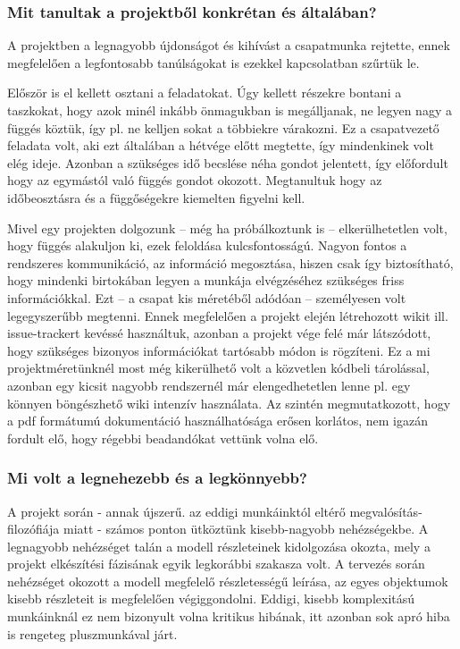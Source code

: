 		\subsubsection*{Mit tanultak a projektből konkrétan és általában?}
		A projektben a legnagyobb újdonságot és kihívást a csapatmunka rejtette, ennek megfelelően a legfontosabb tanúlságokat is ezekkel kapcsolatban szűrtük le.
		
		Először is el kellett osztani a feladatokat. Úgy kellett részekre bontani a taszkokat, hogy azok minél inkább önmagukban is megálljanak, ne legyen nagy a függés köztük, így pl. ne kelljen sokat a többiekre várakozni. Ez a csapatvezető feladata volt, aki ezt általában a hétvége előtt megtette, így mindenkinek volt elég ideje. Azonban a szükséges idő becslése néha gondot jelentett, így előfordult hogy az egymástól való függés gondot okozott. Megtanultuk hogy az időbeosztásra és a függőségekre kiemelten figyelni kell.
		
		Mivel egy projekten dolgozunk -- még ha próbálkoztunk is -- elkerülhetetlen volt, hogy függés alakuljon ki, ezek feloldása kulcsfontosságú. Nagyon fontos a rendszeres kommunikáció, az információ megosztása, hiszen csak így biztosítható, hogy mindenki birtokában legyen a munkája elvégzéséhez szükséges friss információkkal. Ezt -- a csapat kis méretéből adódóan -- személyesen volt legegyszerűbb megtenni. Ennek megfelelően a projekt elején létrehozott wikit ill. issue-trackert kevéssé használtuk, azonban a projekt vége felé már látszódott, hogy szükséges bizonyos információkat tartósabb módon is rögzíteni. Ez a mi projektméretünknél most még kikerülhető volt a közvetlen kódbeli tárolással, azonban egy kicsit nagyobb rendszernél már elengedhetetlen lenne pl. egy könnyen böngészhető wiki intenzív használata. Az szintén megmutatkozott, hogy a pdf formátumú dokumentáció használhatósága erősen korlátos, nem igazán fordult elő, hogy régebbi beadandókat vettünk volna elő.
		
		\subsubsection*{Mi volt a legnehezebb és a legkönnyebb?}
A projekt során - annak újszerű. az eddigi munkáinktól eltérő megvalósítás-filozófiája miatt - számos ponton ütköztünk kisebb-nagyobb nehézségekbe. A legnagyobb nehézséget talán a modell részleteinek kidolgozása okozta, mely a projekt elkészítési fázisának egyik legkorábbi szakasza volt. A tervezés során nehézséget okozott a modell megfelelő részletességű leírása, az egyes objektumok kisebb részleteit is megfelelően végiggondolni. Eddigi, kisebb komplexitású munkáinknál ez nem bizonyult volna kritikus hibának, itt azonban sok apró hiba is rengeteg pluszmunkával járt.

